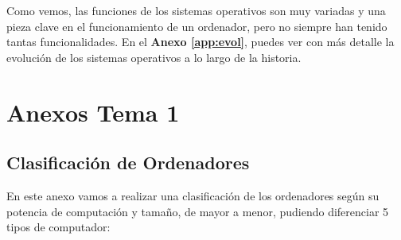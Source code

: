 Como vemos, las funciones de los sistemas operativos son muy variadas y una pieza clave en el funcionamiento de un ordenador, pero no siempre han tenido tantas funcionalidades. En el \textbf{Anexo \ref{app:evol}}, puedes ver con más detalle la evolución de los sistemas operativos a lo largo de la historia.












\appendix


\chapter{Anexos Tema 1}

\section{Clasificación de Ordenadores}
En este anexo vamos a realizar una clasificación de los ordenadores según su potencia de computación y tamaño, de mayor a menor, pudiendo diferenciar 5 tipos de computador:

